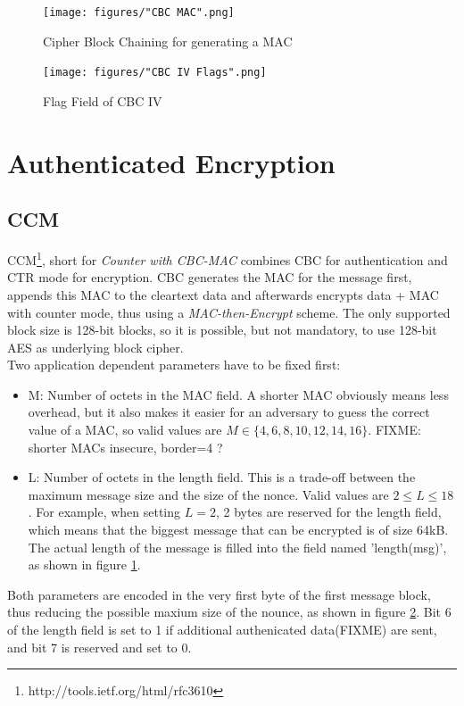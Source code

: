 \begin{figure}\label{cbcMAC}
    \centering
    \texttt{[image: figures/"CBC MAC".png]}
    \caption{Cipher Block Chaining for generating a MAC}
    \label{fig:cbc_MAC}
\end{figure}

\begin{figure}\label{cbcMACFlags}
    \centering
    \texttt{[image: figures/"CBC IV Flags".png]}
    \caption{Flag Field of CBC IV}
    \label{fig:cbc_Flags}
\end{figure}

\section{Authenticated Encryption}\label{authEncrypt}

\subsection{CCM}

CCM\footnote{http://tools.ietf.org/html/rfc3610}, short for \textit{Counter with CBC-MAC} combines CBC for authentication and CTR mode for encryption.
CBC generates the MAC for the message first, appends this MAC to the cleartext data and afterwards encrypts data + MAC with counter mode, thus using a
\textit{MAC-then-Encrypt} scheme. The only
supported block size is 128-bit blocks, so it is possible, but not mandatory, to use 128-bit AES as underlying block cipher.
\\
Two application dependent parameters have to be fixed first: 
\begin{itemize}
 \item M: Number of octets in the MAC field. A shorter MAC obviously means less overhead, but it also makes it easier for an adversary to guess the correct
 value of a MAC, so valid values are $M \in \{4, 6, 8, 10, 12, 14, 16\}$. FIXME: shorter MACs insecure, border=4 ? 
 \item L: Number of octets in the length field. This is a trade-off between the maximum message size and the size of the nonce. Valid values are $2 \leq L \leq 18$.
 For example, when setting $L = 2$, 2 bytes are reserved for the length field, which means that the biggest message that can be encrypted is of size 64kB. The actual
 length of the message is filled into the field named 'length(msg)', as shown in figure \ref{fig:cbc_MAC}.
\end{itemize}

Both parameters are encoded in the very first byte of the first message block, thus reducing the possible maxium size of the nounce, as shown in figure \ref{fig:cbc_Flags}.
Bit 6 of the length field is set to 1 if additional authenicated data(FIXME) are sent, and bit 7 is reserved and set to 0.



